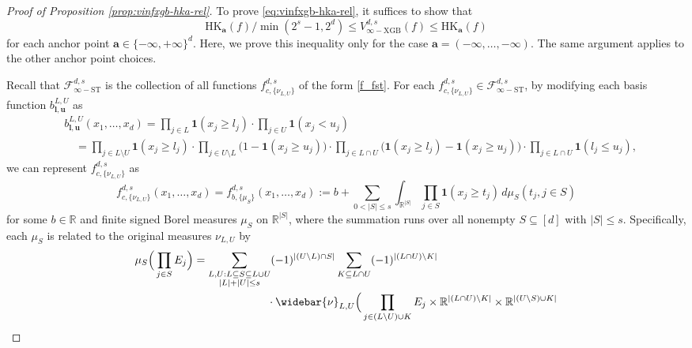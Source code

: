 \documentclass[10pt]{article}
\newcommand{\R}{{\mathbb R}}
\newcommand{\fstinf}{{\mathcal{F}^{d, s}_{\infty-\text{ST}}}}
\newcommand{\vinfxgb}{{V^{d, s}_{\infty-\text{XGB}}}}
\newcommand{\hk}{{\text{HK}}}
\newcommand{\fcnu}{{f^{d, s}_{c, \{\nu_{L, U}\}}}}
\newcommand{\lbf}{{\mathbf{l}}}
\newcommand{\ubf}{{\mathbf{u}}}
\newcommand{\abf}{{\mathbf{a}}}
\newcommand{\ind}{{\mathbf{1}}}
\begin{document}
\begin{proof}[Proof of Proposition \ref{prop:vinfxgb-hka-rel}]
To prove \eqref{eq:vinfxgb-hka-rel}, it suffices to show that 
\begin{equation*}
    \hk_{\abf}(f) / \min(2^s - 1, 2^d) \le \vinfxgb(f) 
    \le \hk_{\abf}(f)
\end{equation*}
for each anchor point $\abf \in \{-\infty, +\infty\}^d$.
Here, we prove this inequality only for the case 
$\abf = (-\infty, \dots, -\infty)$. The same argument applies to 
the other anchor point choices.

Recall that $\fstinf$ is the collection of all functions 
$\fcnu$ of the form \eqref{f_fst}. 
For each $\fcnu \in \fstinf$, by modifying 
each basis function $b^{L, U}_{\lbf, \ubf}$ as 
\begin{align}\label{eq:modification-of-indicator-function}
    &b^{L, U}_{\lbf, \ubf}(x_1, \dots, x_d) 
    = \prod_{j \in L} \ind(x_j \ge l_j) 
    \cdot \prod_{j \in U} \ind(x_j < u_j) \\
    &\quad= \prod_{j \in L \setminus U} \ind(x_j \ge l_j) 
    \cdot \prod_{j \in U \setminus L} \big(1 - \ind(x_j \ge u_j)\big)
    \cdot \prod_{j \in L \cap U} 
    \big(\ind(x_j \ge l_j) - \ind(x_j \ge u_j)\big)
    \cdot \prod_{j \in L \cap U} \ind(l_j \le u_j), \nonumber
\end{align}
we can represent $\fcnu$ as 
\begin{equation}\label{eq:alternative-representation-of-fstinf}
    \fcnu(x_1, \dots, x_d) 
    = f^{d, s}_{b, \{\mu_S\}}(x_1, \dots, x_d) 
    := b + \sum_{0 < |S| \le s} 
    \int_{\R^{|S|}} \prod_{j \in S} \ind(x_j \ge t_j)
    \, d\mu_S(t_j, j \in S) 
\end{equation}
for some $b \in \R$ and finite signed Borel measures $\mu_S$ 
on $\R^{|S|}$, where the summation runs over all nonempty 
$S \subseteq [d]$ with $|S| \le s$.
Specifically, each $\mu_S$ is related to 
the original measures $\nu_{L, U}$ by
\begin{align}\label{eq:relation-between-mu-and-nu}
    &\mu_S\Big(\prod_{j \in S} E_j\Big) 
    = \sum_{\substack{L, U: L \subseteq S \subseteq L \cup U \\
    |L| + |U| \le s}}
    (-1)^{|(U \setminus L) \cap S|}
    \sum_{K \subseteq L \cap U} (-1)^{|(L \cap U) \setminus K|} \\
    &\qquad \qquad \qquad \qquad \qquad \qquad
    \cdot \widebar{\nu}_{L, U}
    \Big(\prod_{j \in (L \setminus U) \cup K} E_j 
    \times \R^{|(L \cap U) \setminus K|} 
    \times \R^{|(U \setminus S) \cup K|} 

\end{align}
\end{proof}
\end{document}
